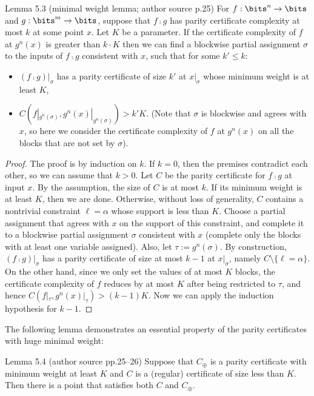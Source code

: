 \begin{originalresult}{Lemma 5.3 (minimal weight lemma; author source p.25)}
For $f:\bits^n\to\bits$ and $g:\bits^m\to\bits$, suppose that $f\comp g$ has parity certificate complexity at most $k$ at some point $x$. Let $K$ be a parameter. If the certificate complexity of $f$ at $g^n(x)$ is greater than $k\cdot K$ then we can find a blockwise partial assignment $\sigma$ to the inputs of $f\comp g$ consistent with $x$, such that for some $k'\le k$:
\begin{itemize}
\item $(f\comp g)|_\sigma$ has a parity certificate of size $k'$ at $x|_\sigma$ whose minimum weight is at least $K$,
\item $C(f|_{g^n(\sigma)},g^n(x)|_{g^n(\sigma)})>k'K$. (Note that $\sigma$ is blockwise and agrees with $x$, so here we consider the certificate complexity of $f$ at $g^n(x)$ on all the blocks that are not set by $\sigma$).
\end{itemize}
\end{originalresult}
\begin{proof}
The proof is by induction on $k$. If $k=0$, then the premises contradict each other, so we can assume that $k>0$.
Let $C$ be the parity certificate for $f\comp g$ at input $x$. By the assumption, the size of $C$ is at most $k$. If its minimum weight is at least $K$, then we are done. Otherwise, without loss of generality, $C$ contains a nontrivial constraint $\ell=\alpha$ whose support is less than $K$. Choose a partial assignment that agrees with $x$ on the support of this constraint, and complete it to a blockwise partial assignment $\sigma$ consistent with $x$ (complete only the blocks with at least one variable assigned). Also, let $\tau:=g^n(\sigma)$.
By construction, $(f\comp g)|_\sigma$ has a parity certificate of size at most $k-1$ at $x|_\sigma$, namely $C\setminus\{\ell=\alpha\}$. On the other hand, since we only set the values of at most $K$ blocks, the certificate complexity of $f$ reduces by at most $K$ after being restricted to $\tau$, and hence $C(f|_\tau,g^n(x)|_\tau)>(k-1)K$. Now we can apply the induction hypothesis for $k-1$.
\end{proof}
The following lemma demonstrates an essential property of the parity certificates with huge minimal weight:
\begin{originalresult}{Lemma 5.4 (author source pp.25--26)}
Suppose that $C_\oplus$ is a parity certificate with minimum weight at least $K$ and $C$ is a (regular) certificate of size less than $K$. Then there is a point that satisfies both $C$ and $C_\oplus$.
\end{originalresult}
